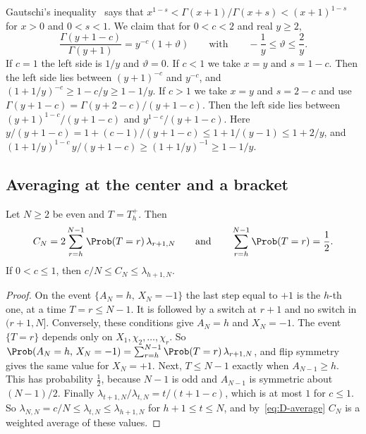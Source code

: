 Gautschi's inequality~\cite[5.6.4]{dlmf} says that
$x^{1-s}<\Gamma(x+1)/\Gamma(x+s)<(x+1)^{1-s}$ for $x>0$ and $0<s<1$. We
claim that for $0<c<2$ and real $y\ge2$,
\begin{equation}\label{eq:D-gamma}
\frac{\Gamma(y+1-c)}{\Gamma(y+1)}=y^{-c}(1+\vartheta)\qquad\text{with}\qquad
-\frac1y\le\vartheta\le\frac2y .
\end{equation}
If $c=1$ the left side is $1/y$ and $\vartheta=0$. If $c<1$ we take $x=y$ and
$s=1-c$. Then the left side lies between $(y+1)^{-c}$ and $y^{-c}$, and
$(1+1/y)^{-c}\ge1-c/y\ge1-1/y$. If $c>1$ we take $x=y$ and $s=2-c$ and use
$\Gamma(y+1-c)=\Gamma(y+2-c)/(y+1-c)$. Then the left side lies between
$(y+1)^{1-c}/(y+1-c)$ and $y^{1-c}/(y+1-c)$. Here
$y/(y+1-c)=1+(c-1)/(y+1-c)\le1+1/(y-1)\le1+2/y$, and
$(1+1/y)^{1-c}\,y/(y+1-c)\ge(1+1/y)^{-1}\ge1-1/y$.

\subsection{Averaging at the center and a bracket}

\begin{lemma}\label{lem:D-average}
Let $N\ge2$ be even and $T=T^+_h$. Then
\begin{equation}\label{eq:D-average}
C_N=2\sum_{r=h}^{N-1}\Prob(T=r)\,\lambda_{r+1,N}\qquad\text{and}\qquad
\sum_{r=h}^{N-1}\Prob(T=r)=\frac12 .
\end{equation}
If $0<c\le1$, then $c/N\le C_N\le\lambda_{h+1,N}$.
\end{lemma}

\begin{proof}
On the event $\{A_N=h,\,X_N=-1\}$ the last step equal to $+1$ is the $h$-th
one, at a time $T=r\le N-1$. It is followed by a switch at $r+1$ and no switch
in $(r+1,N]$. Conversely, these conditions give $A_N=h$ and $X_N=-1$. The
event $\{T=r\}$ depends only on $X_1,\chi_2,\dots,\chi_r$. So
$\Prob(A_N=h,\,X_N=-1)=\sum_{r=h}^{N-1}\Prob(T=r)\,\lambda_{r+1,N}$, and flip
symmetry gives the same value for $X_N=+1$. Next, $T\le N-1$ exactly when
$A_{N-1}\ge h$. This has probability $\frac12$, because $N-1$ is odd and
$A_{N-1}$ is symmetric about $(N-1)/2$. Finally
$\lambda_{t+1,N}/\lambda_{t,N}=t/(t+1-c)$, which is at most $1$ for $c\le1$.
So $\lambda_{N,N}=c/N\le\lambda_{t,N}\le\lambda_{h+1,N}$ for
$h+1\le t\le N$, and by~\eqref{eq:D-average} $C_N$ is a weighted average of
these values.
\end{proof}

